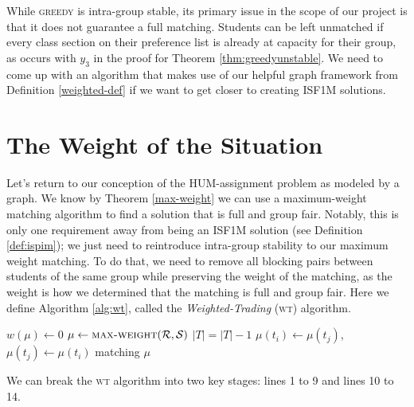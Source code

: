 While \textsc{greedy} is intra-group stable, its primary issue in the scope of
our project is that
it does not guarantee a full matching. Students can be left unmatched if every
class section on their preference list is already at capacity for their group,
as occurs with $y_3$ in the proof for Theorem \ref{thm:greedyunstable}.
We need to come up with an algorithm that makes use of our
helpful graph framework from Definition \ref{weighted-def} if we want to get
closer to creating ISF1M solutions.

\section{The Weight of the Situation}
Let's return to our conception of the HUM-assignment problem as modeled by a graph. We
know by Theorem \ref{max-weight} we can use a maximum-weight matching algorithm
to find a solution that is full and group fair. Notably, this is only one
requirement away from being an ISF1M solution
(see Definition \ref{def:ispim}); we just need to reintroduce intra-group
stability to our maximum weight matching. To do that, we need to
remove all blocking pairs between students of the same group while preserving
the weight of the matching, as the weight is how we determined that
the matching is full and group fair. Here we define Algorithm \ref{alg:wt}, called
the \textit{Weighted-Trading} (\textsc{wt}) algorithm.

\begin{algorithm}
  \caption{Weighted-Trading}
  \label{alg:wt}
  \begin{algorithmic}[1] \State $w(\mu) \gets 0$ 
    \State $\mu \gets \textsc{max-weight}(\mathcal{R}, \mathcal{S})$   \State $|T| =
  |T| - 1$  \EndFor
  \EndIf \EndWhile {}
     \State $\mu(t_i) \gets \mu(t_j)$,
    $\mu(t_j) \gets \mu(t_i)$ \EndWhile \EndFor \State \Return matching $\mu$
  \end{algorithmic}
\end{algorithm}

We can break the \textsc{wt} algorithm into two key stages: lines 1 to 9 and
lines 10 to 14. 


